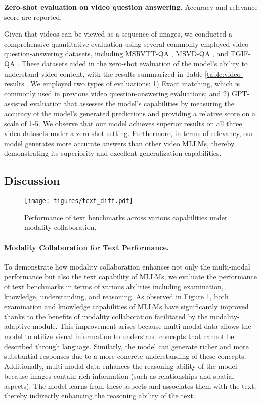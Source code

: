 \documentclass[10pt,twocolumn,letterpaper]{article}
\begin{document}
\begin{table}[h]
{    }
    \caption{\textbf{Zero-shot evaluation on video question answering.} Accuracy and relevance score are reported.}
    \vspace{-2ex}
    \label{table:video-results}
\end{table} Given that videos can be viewed as a sequence of images, we conducted a comprehensive quantitative evaluation using several commonly employed video question-answering datasets, including MSRVTT-QA \cite{xu2017msrvttqa}, MSVD-QA \cite{xu2017msrvttqa}, and TGIF-QA \cite{jang2017tgif}. These datasets aided in the zero-shot evaluation of the model's ability to understand video content, with the results summarized in Table \ref{table:video-results}. We employed two types of evaluations: 1) Exact matching, which is commonly used in previous video question-answering evaluations; and 2) GPT-assisted evaluation \cite{Maaz2023VideoChatGPT} that assesses the model's capabilities by measuring the accuracy of the model’s generated predictions and providing a relative score on a scale of 1-5. We observe that our model achieves superior results on all three video datasets under a zero-shot setting. Furthermore, in terms of relevancy, our model generates more accurate answers than other video MLLMs, thereby demonstrating its superiority and excellent generalization capabilities.

\subsection{Discussion}
\begin{figure}[t]
    \centering
    \texttt{[image: figures/text\_diff.pdf]}
    \vspace{-4ex}
    \caption{Performance of text benchmarks across various capabilities under modality collaboration.}
    \label{fig:text-collab}
    \vspace{-2ex}
\end{figure}

\paragraph{Modality Collaboration for Text Performance.}
To demonstrate how modality collaboration enhances not only the multi-modal performance but also the text capability of MLLMs, we evaluate the performance of text benchmarks in terms of various abilities including examination, knowledge, understanding, and reasoning. As observed in Figure \ref{fig:text-collab}, both examination and knowledge capabilities of MLLMs have significantly improved thanks to the benefits of modality collaboration facilitated by the modality-adaptive module. This improvement arises because multi-modal data allows the model to utilize visual information to understand concepts that cannot be described through language. Similarly, the model can generate richer and more substantial responses due to a more concrete understanding of these concepts. Additionally, multi-modal data enhances the reasoning ability of the model because images contain rich information (such as relationships and spatial aspects). The model learns from these aspects and associates them with the text, thereby indirectly enhancing the reasoning ability of the text.
\end{document}
